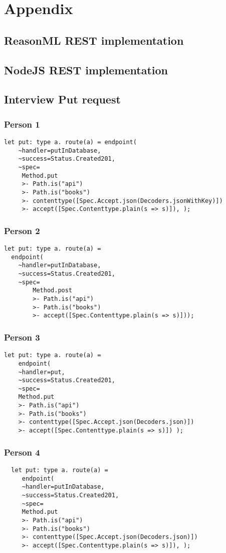 \chapter*{Appendix}\label{appendix}

\section{ReasonML REST implementation}\label{reasonmlrest}
\section{NodeJS REST implementation}\label{nodejsrest}

\section*{Interview Put request}

\subsection{Person 1}\label{putperson1}
\begin{lstlisting}
let put: type a. route(a) = endpoint(
	~handler=putInDatabase, 
    ~success=Status.Created201, 
    ~spec= 
	 Method.put 
	 >- Path.is("api")
	 >- Path.is("books") 
	 >- contenttype([Spec.Accept.json(Decoders.jsonWithKey)]) 
	 >- accept([Spec.Contenttype.plain(s => s)]), ); 
\end{lstlisting}

\subsection{Person 2}\label{putperson2}
\begin{lstlisting}
let put: type a. route(a) =
  endpoint(
	~handler=putInDatabase,
	~success=Status.Created201,
	~spec=
		Method.post
		>- Path.is("api")
		>- Path.is("books")
		>- accept([Spec.Contenttype.plain(s => s)]));
\end{lstlisting}

\subsection{Person 3}\label{putperson3}
\begin{lstlisting}
let put: type a. route(a) =
    endpoint(
	~handler=put,
	~success=Status.Created201,
	~spec=
	Method.put
	>- Path.is("api")
	>- Path.is("books")
	>- contenttype([Spec.Accept.json(Decoders.json)])
	>- accept([Spec.Contenttype.plain(s => s)]) );
\end{lstlisting}

\subsection{Person 4}\label{putperson4}
\begin{lstlisting}
  let put: type a. route(a) = 
     endpoint( 
	 ~handler=putInDatabase, 
	 ~success=Status.Created201, 
   	 ~spec=
     Method.put 
	 >- Path.is("api") 
	 >- Path.is("books") 
	 >- contenttype([Spec.Accept.json(Decoders.json)]) 
	 >- accept([Spec.Contenttype.plain(s => s)]), );
\end{lstlisting}


